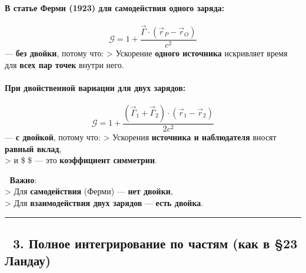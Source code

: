 \documentclass[11pt]{article}
\begin{document}
\paragraph{\texorpdfstring{В статье Ферми (1923) для
\textbf{самодействия одного
заряда}:}{В статье Ферми (1923) для самодействия одного заряда:}}\label{ux432-ux441ux442ux430ux442ux44cux435-ux444ux435ux440ux43cux438-1923-ux434ux43bux44f-ux441ux430ux43cux43eux434ux435ux439ux441ux442ux432ux438ux44f-ux43eux434ux43dux43eux433ux43e-ux437ux430ux440ux44fux434ux430}

\[
\mathcal{G} = 1 + \frac{\vec{\Gamma} \cdot (\vec{r}_P - \vec{r}_O)}{c^2}
\] --- \textbf{без двойки}, потому что: \textgreater{} Ускорение
\textbf{одного источника} искривляет время для \textbf{всех пар точек}
внутри него.

\paragraph{\texorpdfstring{При \textbf{двойственной вариации для двух
зарядов}:}{При двойственной вариации для двух зарядов:}}\label{ux43fux440ux438-ux434ux432ux43eux439ux441ux442ux432ux435ux43dux43dux43eux439-ux432ux430ux440ux438ux430ux446ux438ux438-ux434ux43bux44f-ux434ux432ux443ux445-ux437ux430ux440ux44fux434ux43eux432}

\[
\mathcal{G} = 1 + \frac{(\vec{\Gamma}_1 + \vec{\Gamma}_2) \cdot (\vec{r}_1 - \vec{r}_2)}{2c^2}
\] --- \textbf{с двойкой}, потому что: \textgreater{} Ускорения
\textbf{источника и наблюдателя} вносят \textbf{равный вклад},\\
\textgreater{} и \$  \$ --- это \textbf{коэффициент
симметрии}.

📌 \textbf{Важно}:\\
\textgreater{} Для \textbf{самодействия} (Ферми) --- \textbf{нет
двойки},\\
\textgreater{} Для \textbf{взаимодействия двух зарядов} --- \textbf{есть
двойка}.

\begin{center}\rule{0.5\linewidth}{\linethickness}\end{center}

\subsection{🔹 3. Полное интегрирование по частям (как в §23
Ландау)}\label{ux43fux43eux43bux43dux43eux435-ux438ux43dux442ux435ux433ux440ux438ux440ux43eux432ux430ux43dux438ux435-ux43fux43e-ux447ux430ux441ux442ux44fux43c-ux43aux430ux43a-ux432-23-ux43bux430ux43dux434ux430ux443}
\end{document}
